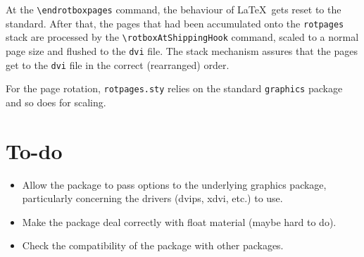 \documentclass[12pt,twocolumn]{article}
\begin{document}
At the \verb|\endrotboxpages| command, the behaviour of \LaTeX\ gets
reset to the standard. After that, the pages that had been accumulated
onto the \texttt{rotpages} stack are processed by the
\verb|\rotboxAtShippingHook| command, scaled to a normal page size and
flushed to the \texttt{dvi} file. The stack mechanism assures that the
pages get to the \texttt{dvi} file in the correct (rearranged) order.

For the page rotation, \texttt{rotpages.sty} relies on the standard
\texttt{graphics} package and so does for scaling. 

\section{To-do}
\begin{itemize}
\item Allow the package to pass options to the underlying graphics
  package, particularly concerning the drivers (dvips, xdvi, etc.) to
  use.
\item Make the package deal correctly with float material (maybe hard
  to do).
\item Check the compatibility of the package with other packages.
\end{itemize}
\end{document}
